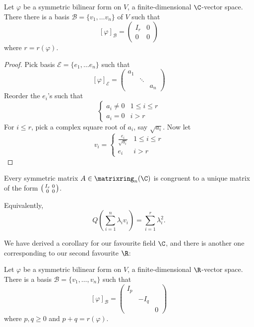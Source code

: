\documentclass[a4paper]{article}
\newcommand*{\M}{\matrixring}
\newcommand*{\basis}{\mathcal}
\theoremstyle{definition}
\begin{document}
\begin{corollary}
  Let \(\varphi\) be a symmetric bilinear form on \(V\), a finite-dimensional \(\C\)-vector space. There there is a basis \(\basis B = \{v_1, \dots v_n\}\) of \(V\) such that
  \[
    [\varphi]_{\basis B} =
    \begin{pmatrix}
      I_r & 0 \\
      0 & 0
    \end{pmatrix}
  \]
  where \(r = r(\varphi)\).
\end{corollary}

\begin{proof}
  Pick basis \(\basis E = \{e_1, \dots e_n\}\) such that
  \[
    [\varphi]_{\basis E} =
    \begin{pmatrix}
      a_1 & & \\
      & \ddots & \\
      & & a_n
    \end{pmatrix}
  \]
  Reorder the \(e_i\)'s such that
  \[
    \begin{cases}
      a_i \neq 0 & 1 \leq i \leq r \\
      a_i = 0 & i > r
    \end{cases}
  \]
  For \(i \leq r\), pick a complex square root of \(a_i\), say \(\sqrt{a_i}\). Now let
  \[
    v_i =
    \begin{cases}
      \frac{e_i}{\sqrt{a_i}} & 1 \leq i \leq r \\
      e_i & i > r
    \end{cases}
  \]
\end{proof}

\begin{corollary}
  Every symmetric matrix \(A \in \M_n(\C)\) is congruent to a unique matrix of the form \(\begin{psmallmatrix} I_r & 0 \\ 0 & 0 \end{psmallmatrix}\).
\end{corollary}

Equivalently,
\[
  Q \left( \sum_{i = 1}^{n} \lambda_i v_i \right) = \sum_{i = 1}^{r} \lambda_i^2.
\]

We have derived a corollary for our favourite field \(\C\), and there is another one corresponding to our second favourite \(\R\):

\begin{corollary}
  Let \(\varphi\) be a symmetric bilinear form on \(V\), a finite-dimensional \(\R\)-vector space. There is a basis \(\basis B = \{v_1, \dots, v_n\}\) such that
  \[
    [\varphi]_{\basis B} =
    \begin{pmatrix}
      I_p & & \\
      & -I_q & \\
      & & 0
    \end{pmatrix}
  \]
  where \(p, q \geq 0\) and \(p + q = r(\varphi)\).
\end{corollary}
\end{document}

